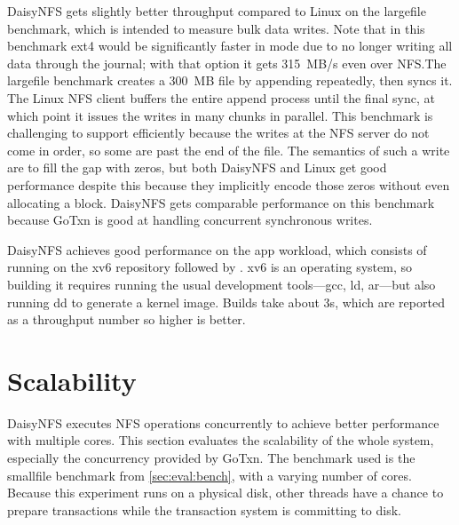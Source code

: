 DaisyNFS gets slightly better throughput compared to Linux on the largefile benchmark, which is
intended to measure bulk data writes. Note that in this benchmark ext4 would be
significantly faster in  mode due to no longer writing all data
through the journal; with that option it gets 315~MB/s even over
NFS.\@ The largefile benchmark creates a 300~MB file by appending repeatedly, then
syncs it. The Linux NFS client buffers the entire append process until the final
sync, at which point it issues the writes in many chunks in parallel. This
benchmark is challenging to support efficiently because the writes at the NFS
server do not come in order, so some are past the end of the file. The semantics
of such a write are to fill the gap with zeros, but both DaisyNFS and Linux get good
performance despite this because they implicitly encode those zeros without even
allocating a block. DaisyNFS gets comparable performance on this benchmark because
GoTxn is good at handling concurrent synchronous writes.

DaisyNFS achieves good performance on the app workload, which consists of running
 on the xv6 repository followed by . xv6 is an operating
system, so building it requires running the usual development tools---gcc, ld,
ar---but also running dd to generate a kernel image. Builds take about 3s,
which are reported as a throughput number so higher is better.
\section{Scalability}
\label{sec:eval:scale}

DaisyNFS executes NFS operations concurrently to achieve better performance with
multiple cores. This section evaluates the scalability of the whole system,
especially the concurrency provided by GoTxn. The benchmark used is the smallfile benchmark from
\cref{sec:eval:bench}, with a varying number of cores. Because this experiment runs
on a physical disk, other threads have a chance to prepare transactions while the
transaction system is committing to disk.


